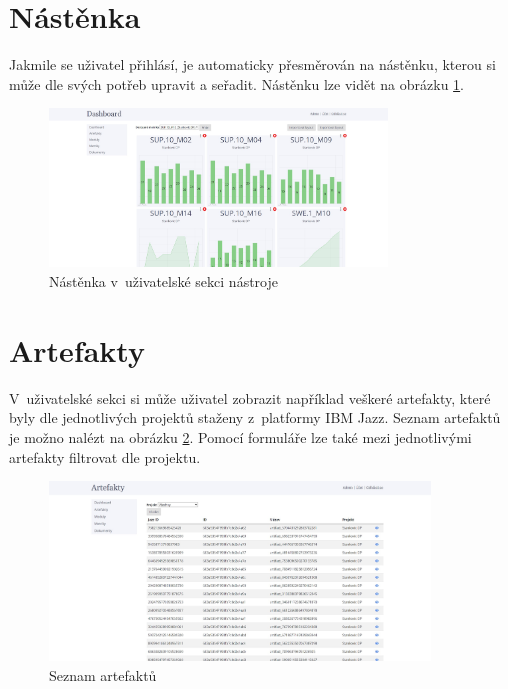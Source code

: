 \documentclass[czech,master]{diploma}
\begin{document}
\newpage
\section{Nástěnka}

Jakmile se uživatel přihlásí, je automaticky přesměrován na nástěnku, kterou si může dle svých potřeb upravit a seřadit. Nástěnku lze vidět na obrázku \ref{fig:metrics_tool_dashboard}.

\begin{figure}[!ht]
    \centering
    \includegraphics[width=0.8\textwidth]{Diplomka/Figures/metrics_tool/dashboard.jpg}
    \caption{Nástěnka v~uživatelské sekci nástroje}
    \label{fig:metrics_tool_dashboard}
\end{figure}
\section{Artefakty}
V~uživatelské sekci si může uživatel zobrazit například veškeré artefakty, které byly dle jednotlivých projektů staženy z~platformy IBM Jazz. Seznam artefaktů je možno nalézt na obrázku \ref{fig:metrics_tool_artifacts}. Pomocí formuláře lze také mezi jednotlivými artefakty filtrovat dle projektu.

\begin{figure}[!ht]
    \centering
    \includegraphics[width=0.9\textwidth]{Diplomka/Figures/metrics_tool/artifacts.jpg}
    \caption{Seznam artefaktů}
    \label{fig:metrics_tool_artifacts}
\end{figure}
\end{document}
